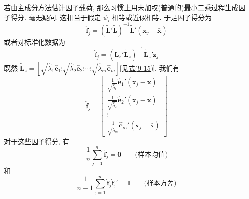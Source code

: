 \quad 若由主成分方法估计因子载荷, 那么习惯上用未加权(普通的)最小二乘过程生成因子得分. 毫无疑问, 这相当于假定 $\psi_i$ 相等或近似相等. 于是因子得分为
\[
\hat{\mathbf{f}}_j=(\tilde{\mathbf{L}}'\tilde{\mathbf{L}})^{-1}\tilde{\mathbf{L}}'(\mathbf{x}_j-\bar{\mathbf{x}})
\]
或者对标准化数据为
\[
\hat{\mathbf{f}}_j=(\tilde{\mathbf{L}}_z'\tilde{\mathbf{L}}_z)^{-1}\tilde{\mathbf{L}}_z'\mathbf{z}_j
\]
既然 $\tilde{\mathbf{L}}_z=[\sqrt{\hat{\lambda}_1}\hat{\mathbf{e}}_1 \vdots \sqrt{\hat{\lambda}_2}\hat{\mathbf{e}}_2 \vdots \cdots \vdots \sqrt{\hat{\lambda}_m}\hat{\mathbf{e}}_m]$[见\hyperref[eq:9-15]{式(9-15)}], 我们有
\label{eq:9-51}
\begin{equation}
\hat{\mathbf{f}}_j=
\begin{bmatrix}
\frac{1}{\sqrt{\hat{\lambda}_1}}\hat{\mathbf{e}}_1'(\mathbf{x}_j-\bar{\mathbf{x}})\\[6pt]
\frac{1}{\sqrt{\hat{\lambda}_2}}\hat{\mathbf{e}}_2'(\mathbf{x}_j-\bar{\mathbf{x}})\\[6pt]
\vdots\\[4pt]
\frac{1}{\sqrt{\hat{\lambda}_m}}\hat{\mathbf{e}}_m'(\mathbf{x}_j-\bar{\mathbf{x}})
\end{bmatrix}
\tag{9-51}
\end{equation}
对于这些因子得分, 有
\[
\frac{1}{n}\sum_{j=1}^{n}\hat{\mathbf{f}}_j=\mathbf{0}\qquad\text{(样本均值)}
\]
和
\[
\frac{1}{n-1}\sum_{j=1}^{n}\hat{\mathbf{f}}_j\hat{\mathbf{f}}_j'=\mathbf{I}\qquad\text{(样本方差)}
\]
